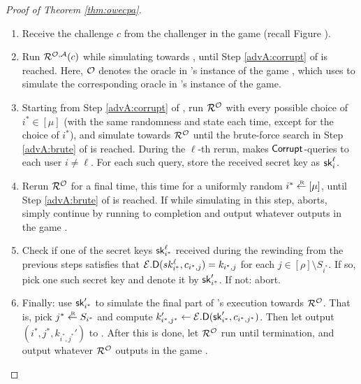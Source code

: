 \begin{proof}[Proof of Theorem \ref{thm:owecpa}]
  \begin{enumerate}[itemsep=0.1cm]
    \item Receive the challenge \(c\) from the challenger in the game \SICA (recall Figure ).
    \item Run \(\redR^{\oracle,\advA}(c)\) while simulating \advA towards \redR,
          until Step \ref{advA:corrupt} of \advA is reached.
          Here, \(\mathcal{O}\) denotes the oracle in \redM's instance of the game \SICA,
          which \redM uses to simulate the corresponding oracle in \redR's instance of the game.
    \item\label{advM:rewind} Starting from Step \ref{advA:corrupt} of \advA, run \(\redR^{\oracle}\) with every possible choice of \(i^{*} \in [\mu]\)
          (with the same randomness and state each time, except for the choice of \(i^{*}\)),
          and simulate \advA towards \(\redR^{\oracle}\)
          until the brute-force search in Step \ref{advA:brute} of \advA is reached.
          During the \(\ell\)-th rerun, \advA makes \(\mathsf{Corrupt}\)-queries to each user \(i \ne \ell\).
          For each such query, store the received secret key as \(\mathsf{sk}_{i}^{\ell}\).
    \item\label{advM:sample} Rerun \(\redR^{\oracle}\) for a final time, this time for a uniformly random \(i^{*} \sampleR [\mu]\),
          until Step \ref{advA:brute} of \advA is reached.
          If while simulating \advA in this step, \advA aborts,
          simply continue by running \redR to completion
          and output whatever \redR outputs in the game \SICA.
    \item\label{advM:key} Check if one of the secret keys \(\mathsf{sk}_{i^{*}}^{\ell}\) received during the rewinding
          from the previous steps satisfies that
          \(\mathcal{E}.\mathsf{D}(sk_{i^{*}}^{\ell},c_{i^{*},j}) = k_{i^{*},j}\)
          for each \(j \in [\rho] \setminus S_{i^{*}}\).
          If so, pick one such secret key and denote it by \(\mathsf{sk}_{i^{*}}'\).
          If not: abort.
    \item Finally: use \(\mathsf{sk}_{i^{*}}'\) to simulate the final part of \advA's execution towards \(\redR^{\oracle}\).
          That is, pick \(j^{*} \sampleR S_{i^{*}}\)
          and compute \(k_{i^{*},j^{*}}' \leftarrow \mathcal{E}.\mathsf{D}(\mathsf{sk}_{i^{*}}',c_{i^{*},j^{*}})\).
          Then let \advA output \((i^{*},j^{*}, k_{i^{*},j^{*}}')\) to \redR.
          After this is done, let \(\redR^{\oracle}\) run until termination,
          and output whatever \(\redR^{\oracle}\) outputs in the game \SICA.
  \end{enumerate}


\end{proof}
